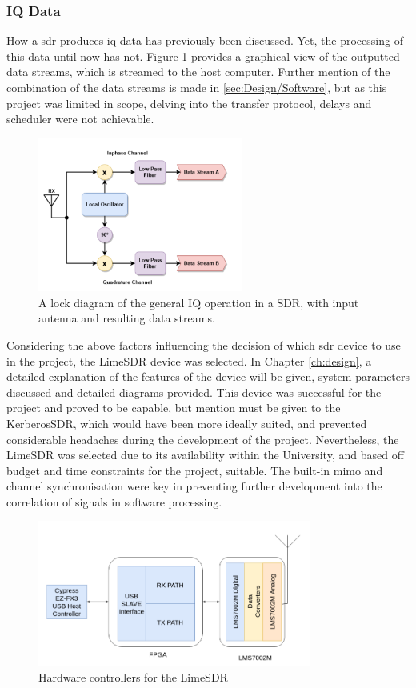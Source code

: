 \documentclass[class=report,11pt,crop=false]{standalone}
\begin{document}
\subsubsection{IQ Data}
How a \gls{sdr} produces \gls{iq} data has previously been discussed. Yet, the processing of this data until now has not. Figure \ref{fig:IQ-sdr} provides a graphical view of the outputted data streams, which is streamed to the host computer. Further mention of the combination of the data streams is made in \ref{sec:Design/Software}, but as this project was limited in scope, delving into the transfer protocol, delays and scheduler were not achievable.

\begin{figure}[h]
    \centering
    \includegraphics[width=0.6\textwidth]{Images/diagrams/IQ_data_SDR.png}
    \caption{A lock diagram of the general IQ operation in a SDR, with input antenna and resulting data streams.}
    \label{fig:IQ-sdr}
\end{figure}

Considering the above factors influencing the decision of which \gls{sdr} device to use in the project, the LimeSDR device was selected. In Chapter \ref{ch:design}, a detailed explanation of the features of the device will be given, system parameters discussed and detailed diagrams provided. This device was successful for the project and proved to be capable, but mention must be given to the KerberosSDR, which would have been more ideally suited, and prevented considerable headaches during the development of the project. Nevertheless, the LimeSDR was selected due to its availability within the University, and based off budget and time constraints for the project, suitable. The built-in \gls{mimo} and channel synchronisation were key in preventing further development into the correlation of signals in software processing. 

\begin{figure}[h]
    \centering
    \includegraphics[width=0.8\textwidth]{Images/diagrams/LimeSDR-interface.png}
    \caption{Hardware controllers for the LimeSDR}
    \label{fig:limeSDR-hardware}
\end{figure}
\end{document}
